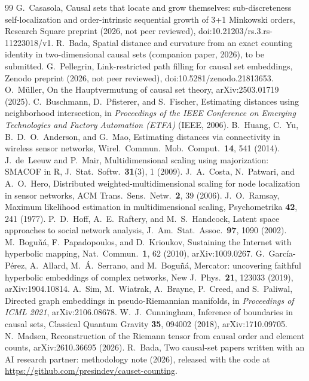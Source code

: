 \documentclass[prd,twocolumn,superscriptaddress,nofootinbib,amsmath,amssymb,floatfix]{revtex4-2}
\begin{document}
\begin{thebibliography}{99}
 G.~Casasola, Causal sets that locate and grow themselves: sub-discreteness self-localization and order-intrinsic sequential growth of 3+1 Minkowski orders, Research Square preprint (2026, not peer reviewed), doi:10.21203/rs.3.rs-11223018/v1.
 R.~Bada, Spatial distance and curvature from an exact counting identity in two-dimensional causal sets (companion paper, 2026), to be submitted.
 G.~Pellegrin, Link-restricted path filling for causal set embeddings, Zenodo preprint (2026, not peer reviewed), doi:10.5281/zenodo.21813653.
 O.~M\"uller, On the Hauptvermutung of causal set theory, arXiv:2503.01719 (2025).
 C.~Buschmann, D.~Pfisterer, and S.~Fischer, Estimating distances using neighborhood intersection, in \emph{Proceedings of the IEEE Conference on Emerging Technologies and Factory Automation (ETFA)} (IEEE, 2006).
 B.~Huang, C.~Yu, B.~D.~O.~Anderson, and G.~Mao, Estimating distances via connectivity in wireless sensor networks, Wirel.\ Commun.\ Mob.\ Comput.\ \textbf{14}, 541 (2014).
 J.~de~Leeuw and P.~Mair, Multidimensional scaling using majorization: SMACOF in R, J.\ Stat.\ Softw.\ \textbf{31}(3), 1 (2009).
 J.~A.~Costa, N.~Patwari, and A.~O.~Hero, Distributed weighted-multidimensional scaling for node localization in sensor networks, ACM Trans.\ Sens.\ Netw.\ \textbf{2}, 39 (2006).
 J.~O.~Ramsay, Maximum likelihood estimation in multidimensional scaling, Psychometrika \textbf{42}, 241 (1977).
 P.~D.~Hoff, A.~E.~Raftery, and M.~S.~Handcock, Latent space approaches to social network analysis, J.\ Am.\ Stat.\ Assoc.\ \textbf{97}, 1090 (2002).
 M.~Bogu\~n\'a, F.~Papadopoulos, and D.~Krioukov, Sustaining the Internet with hyperbolic mapping, Nat.\ Commun.\ \textbf{1}, 62 (2010), arXiv:1009.0267.
 G.~Garc\'ia-P\'erez, A.~Allard, M.~\'A.~Serrano, and M.~Bogu\~n\'a, Mercator: uncovering faithful hyperbolic embeddings of complex networks, New J.\ Phys.\ \textbf{21}, 123033 (2019), arXiv:1904.10814.
 A.~Sim, M.~Wiatrak, A.~Brayne, P.~Creed, and S.~Paliwal, Directed graph embeddings in pseudo-Riemannian manifolds, in \emph{Proceedings of ICML 2021}, arXiv:2106.08678.
 W.~J.~Cunningham, Inference of boundaries in causal sets, Classical Quantum Gravity \textbf{35}, 094002 (2018), arXiv:1710.09705.
 N.~Madsen, Reconstruction of the Riemann tensor from causal order and element counts, arXiv:2610.36695 (2026).
 R.~Bada, Two causal-set papers written with an AI research partner: methodology note (2026), released with the code at \url{https://github.com/presindev/causet-counting}.
\end{thebibliography}
\end{document}

